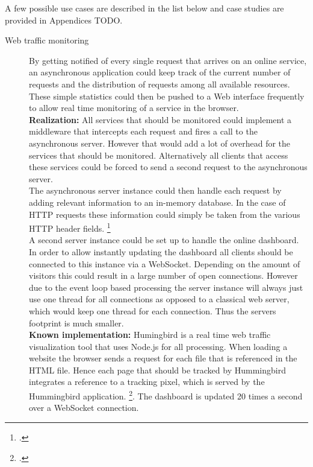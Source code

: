 A few possible use cases are described in the list below and case studies are provided in Appendices TODO.

\begin{description}
  \item[Web traffic monitoring] By getting notified of every single request that
  arrives on an online service, an asynchronous application could keep track of the
  current number of requests and the distribution of requests among all
  available resources. These simple statistics could then be pushed to a Web interface
  frequently to allow real time monitoring of a service in the browser.\\
  \textbf{Realization:} All services that should be monitored could implement a
  middleware that intercepts each request and fires a call to the asynchronous
  server. However that would add a lot of overhead for the services that should
  be monitored. Alternatively all clients that access these services could be forced to send a
  second request to the asynchronous server.\\
  The asynchronous server instance could then handle each request by adding
  relevant information to an in-memory database. In the case of HTTP requests
  these information could simply be taken from the various HTTP header fields.
  \footcite[Cf.][]{http_rfc}\\
  A second server instance could
  be set up to handle the online dashboard.
  In order to allow instantly updating the dashboard all clients should be
  connected to this instance via a WebSocket. Depending on the amount of visitors
  this could result in a large number of open connections. However due to the
  event loop based processing the server instance will always just use one
  thread for all connections as opposed to a classical web server, which would
  keep one thread for each connection. Thus the servers footprint is much
  smaller.\\
  \textbf{Known implementation:} Humingbird is a real time web traffic
  visualization tool that uses Node.js for all processing. When loading a
  website the browser sends a request for each file that is referenced in the
  HTML file. Hence each page that should be tracked by Hummingbird integrates a
  reference to a tracking pixel, which is served by the Hummingbird application.
  \footcite[Cf.][]{hummingbird}. The dashboard is updated 20 times a second
  over a WebSocket connection.
  

\end{description}
